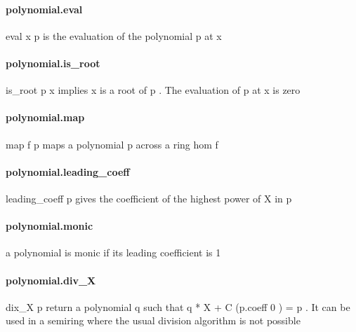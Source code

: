 \documentclass{article}
\begin{document}
\paragraph{polynomial.eval}
\par
\colorbox[RGB]{253,246,227}{{{{\color[RGB]{133, 153, 0} eval }}}{{{\color[RGB]{101, 123, 131}  x p }}}} is the evaluation of the polynomial 
\colorbox[RGB]{253,246,227}{{{{\color[RGB]{101, 123, 131} p }}}} at 
\colorbox[RGB]{253,246,227}{{{{\color[RGB]{101, 123, 131} x }}}}\paragraph{polynomial.is\_root}
\par
\colorbox[RGB]{253,246,227}{{{{\color[RGB]{101, 123, 131} is\_root p x }}}} implies 
\colorbox[RGB]{253,246,227}{{{{\color[RGB]{101, 123, 131} x }}}} is a root of 
\colorbox[RGB]{253,246,227}{{{{\color[RGB]{101, 123, 131} p }}}}. The evaluation of 
\colorbox[RGB]{253,246,227}{{{{\color[RGB]{101, 123, 131} p }}}} at 
\colorbox[RGB]{253,246,227}{{{{\color[RGB]{101, 123, 131} x }}}} is zero
\paragraph{polynomial.map}
\par
\colorbox[RGB]{253,246,227}{{{{\color[RGB]{101, 123, 131} map f p }}}} maps a polynomial 
\colorbox[RGB]{253,246,227}{{{{\color[RGB]{101, 123, 131} p }}}} across a ring hom 
\colorbox[RGB]{253,246,227}{{{{\color[RGB]{101, 123, 131} f }}}}\paragraph{polynomial.leading\_coeff}
\par
\colorbox[RGB]{253,246,227}{{{{\color[RGB]{101, 123, 131} leading\_coeff p }}}} gives the coefficient of the highest power of 
\colorbox[RGB]{253,246,227}{{{{\color[RGB]{101, 123, 131} X }}}} in 
\colorbox[RGB]{253,246,227}{{{{\color[RGB]{101, 123, 131} p }}}}\paragraph{polynomial.monic}
\par
a polynomial is 
\colorbox[RGB]{253,246,227}{{{{\color[RGB]{101, 123, 131} monic }}}} if its leading coefficient is 1
\paragraph{polynomial.div\_X}
\par
\colorbox[RGB]{253,246,227}{{{{\color[RGB]{101, 123, 131} dix\_X p }}}} return a polynomial 
\colorbox[RGB]{253,246,227}{{{{\color[RGB]{101, 123, 131} q }}}} such that 
\colorbox[RGB]{253,246,227}{{{{\color[RGB]{101, 123, 131} q  }}}{{{\color[RGB]{181, 137, 0} * }}}{{{\color[RGB]{101, 123, 131}  X  }}}{{{\color[RGB]{181, 137, 0} + }}}{{{\color[RGB]{101, 123, 131}  C (p.coeff  }}}{{{\color[RGB]{108, 113, 196} 0 }}}{{{\color[RGB]{101, 123, 131} )  }}}{{{\color[RGB]{181, 137, 0} = }}}{{{\color[RGB]{101, 123, 131}  p }}}}.
It can be used in a semiring where the usual division algorithm is not possible
\end{document}
